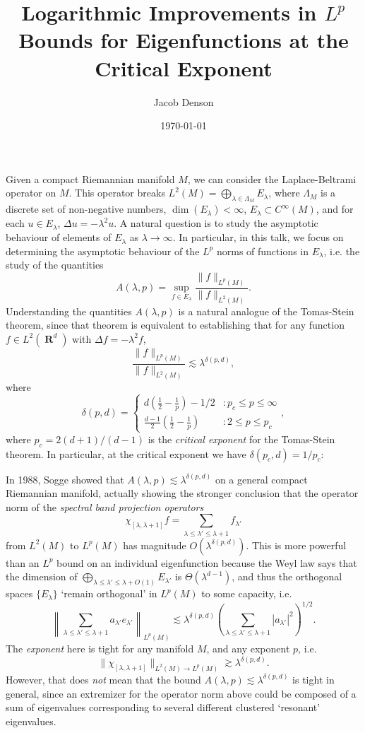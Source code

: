 \documentclass{article}
\title{Logarithmic Improvements in $L^p$ Bounds for Eigenfunctions at the Critical Exponent}
\author{Jacob Denson}
\date{\today}
\DeclareMathOperator{\RR}{\mathbf{R}}
\theoremstyle{plain}
\theoremstyle{remark}
\theoremstyle{definition}
\begin{document}
\maketitle

Given a compact Riemannian manifold $M$, we can consider the Laplace-Beltrami operator on $M$. This operator breaks $L^2(M) = \bigoplus_{\lambda \in \Lambda_M} E_\lambda$, where $\Lambda_M$ is a discrete set of non-negative numbers, $\dim(E_\lambda) < \infty$, $E_\lambda \subset C^\infty(M)$, and for each $u \in E_\lambda$, $\Delta u = - \lambda^2 u$. A natural question is to study the asymptotic behaviour of elements of $E_\lambda$ as $\lambda \to \infty$. In particular, in this talk, we focus on determining the asymptotic behaviour of the $L^p$ norms of functions in $E_\lambda$, i.e. the study of the quantities
%
\[ A(\lambda,p) = \sup_{f \in E_\lambda} \frac{\| f \|_{L^p(M)}}{\| f \|_{L^2(M)}}. \]
%
Understanding the quantities $A(\lambda,p)$ is a natural analogue of the Tomas-Stein theorem, since that theorem is equivalent to establishing that for any function $f \in L^2(\RR^d)$ with $\Delta f = - \lambda^2 f$,
%
\[ \frac{\| f \|_{L^p(M)}}{\| f \|_{L^2(M)}} \lesssim \lambda^{\delta(p,d)}, \]
%
where
%
\[ \delta(p,d) = \begin{cases} d( \frac{1}{2} - \frac{1}{p} ) - 1/2 &: p_c \leq p \leq \infty \\ \frac{d-1}{2} \left( \frac{1}{2} - \frac{1}{p} \right) &: 2 \leq p \leq p_c \end{cases}, \]
%
where $p_c = 2(d+1)/(d-1)$ is the \emph{critical exponent} for the Tomas-Stein theorem. In particular, at the critical exponent we have $\delta(p_c,d) = 1/p_c$:

In 1988, Sogge showed that $A(\lambda,p) \lesssim \lambda^{\delta(p,d)}$ on a general compact Riemannian manifold, actually showing the stronger conclusion that the operator norm of the \emph{spectral band projection operators}
%
\[ \chi_{[\lambda,\lambda + 1]} f = \sum_{\lambda \leq \lambda' \leq \lambda + 1} f_{\lambda'} \]
%
from $L^2(M)$ to $L^p(M)$ has magnitude $O(\lambda^{\delta(p,d)})$. This is more powerful than an $L^p$ bound on an individual eigenfunction because the Weyl law says that the dimension of $\bigoplus_{\lambda \leq \lambda' \leq \lambda + O(1)} E_{\lambda'}$ is $\Theta(\lambda^{d-1})$, and thus the orthogonal spaces $\{ E_\lambda \}$ `remain orthogonal' in $L^p(M)$ to some capacity, i.e.
%
\[ \left\| \sum_{\lambda \leq \lambda' \leq \lambda + 1} a_{\lambda'} e_{\lambda'} \right\|_{L^p(M)} \lesssim \lambda^{\delta(p,d)} \left( \sum_{\lambda \leq \lambda' \leq \lambda + 1} |a_{\lambda'}|^2 \right)^{1/2}. \]
%
The \emph{exponent} here is tight for any manifold $M$, and any exponent $p$, i.e.
%
\[ \| \chi_{[\lambda,\lambda+1]} \|_{L^2(M) \to L^p(M)} \gtrsim \lambda^{\delta(p,d)}. \]
%
However, that does \emph{not} mean that the bound $A(\lambda,p) \lesssim \lambda^{\delta(p,d)}$ is tight in general, since an extremizer for the operator norm above could be composed of a sum of eigenvalues corresponding to several different clustered `resonant' eigenvalues.
\end{document}
